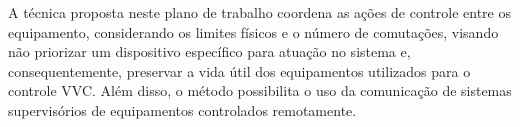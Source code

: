 \documentclass[]{IEEEphot}
\begin{document}
A técnica proposta neste plano de trabalho coordena as ações de controle entre os equipamento, considerando os limites físicos e o número de comutações, visando não priorizar um dispositivo específico para atuação no sistema e, consequentemente, preservar a vida útil dos equipamentos utilizados para o controle VVC. Além disso, o método possibilita o uso da comunicação de sistemas supervisórios de equipamentos controlados remotamente.



 
\end{document}
